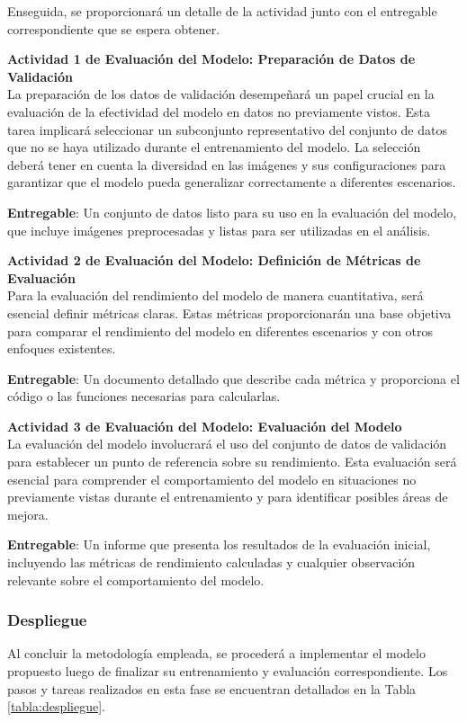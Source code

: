  Enseguida, se proporcionará un detalle de la actividad junto con el entregable correspondiente que se espera obtener.


 \textbf{Actividad 1 de Evaluación del Modelo: Preparación de Datos de Validación}
 \\
 La preparación de los datos de validación desempeñará un papel crucial en la evaluación de la efectividad del modelo en datos no previamente vistos. Esta tarea implicará seleccionar un subconjunto representativo del conjunto de datos que no se haya utilizado durante el entrenamiento del modelo. La selección deberá tener en cuenta la diversidad en las imágenes y sus configuraciones para garantizar que el modelo pueda generalizar correctamente a diferentes escenarios.
 
 \textbf{Entregable}: Un conjunto de datos listo para su uso en la evaluación del modelo, que incluye imágenes preprocesadas y listas para ser utilizadas en el análisis.
 
 \textbf{Actividad 2 de Evaluación del Modelo: Definición de Métricas de Evaluación}
 \\
 Para la evaluación del rendimiento del modelo de manera cuantitativa, será esencial definir métricas claras. Estas métricas proporcionarán una base objetiva para comparar el rendimiento del modelo en diferentes escenarios y con otros enfoques existentes.
 
 \textbf{Entregable}: Un documento detallado que describe cada métrica y proporciona el código o las funciones necesarias para calcularlas.
 
 \textbf{Actividad 3 de Evaluación del Modelo: Evaluación del Modelo}
 \\
 La evaluación del modelo involucrará el uso del conjunto de datos de validación para establecer un punto de referencia sobre su rendimiento. Esta evaluación será esencial para comprender el comportamiento del modelo en situaciones no previamente vistas durante el entrenamiento y para identificar posibles áreas de mejora.
 
 \textbf{Entregable}: Un informe que presenta los resultados de la evaluación inicial, incluyendo las métricas de rendimiento calculadas y cualquier observación relevante sobre el comportamiento del modelo.
 
\subsubsection{Despliegue}
Al concluir la metodología empleada, se procederá a implementar el modelo propuesto luego de finalizar su entrenamiento y evaluación correspondiente. Los pasos y tareas realizados en esta fase se encuentran detallados en la Tabla \ref{tabla:despliegue}.

